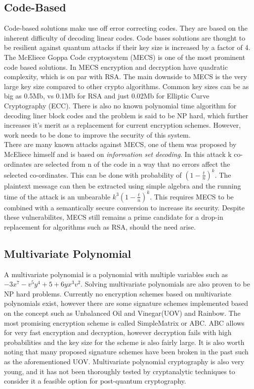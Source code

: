 \documentclass[journal]{IEEEtran}
\begin{document}
\subsection{Code-Based}
Code-based solutions make use off error correcting codes. They are based on the inherent difficulty of decoding linear codes.
Code bases solutions are thought to be resilient against quantum attacks if their key size is increased by a factor of 4. \\
The McEliece Goppa Code cryptosystem (MECS) is one of the most prominent code based solutions. In MECS encryption and decryption have quadratic complexity, which is on par with RSA. The main downside to MECS is the very large key size compared to other crypto algorithms.
Common key sizes can be as big as 0.5Mb, vs 0.1Mb for RSA and just 0.02Mb for Elliptic Curve Cryptography (ECC). There is also no known polynomial time algorithm for decoding liner block codes and the problem is said to be NP hard, which further increases it's merit as a replacement for
current encryption schemes. However, work needs to be done to improve the security of this system. \\
There are many known attacks against MECS, one of them was proposed by McEliece himself and is based on \emph{information set decoding}. In this attack k co-ordinates are selected from n of the code in a way that no errors affect the selected co-ordinates. This can be done with probability of $(1-\frac{t}{n})^k$.
The plaintext message can then be extracted using simple algebra and the running time of the attack is an unbearable $k^3(1-\frac{t}{n})^k$. This requires MECS to be combined with a semantically secure conversion  to increase its security. Despite these vulnerabilites, MECS still remains a prime candidate for a drop-in replacement for algorithms
such as RSA, should the need arise.
\subsection{Multivariate Polynomial}
A multivariate polynomial is a polynomial with multiple variables such as $-3x^7-v^5y^4+5+6yx^3v^2$. Solving multivariate polynomials are also proven to be NP hard problems. Currently no encryption schemes based on multivariate polynomials exist, however there are some signature schemes implemented based on the concept such as 
Unbalanced Oil and Vinegar(UOV) and Rainbow. The most promising encryption scheme is called SimpleMatrix or ABC. ABC allows for very fast encryption and decryption, however decryption fails with high probabilities and the key size for the scheme is also fairly large. It is also worth noting that many proposed signature schemes have been broken in the past such as the aforementioned UOV.
Multivariate polynomial cryptography is also very young, and it has not been thoroughly tested by cryptanalytic techniques to consider it a feasible option for post-quantum cryptography.
\end{document}
